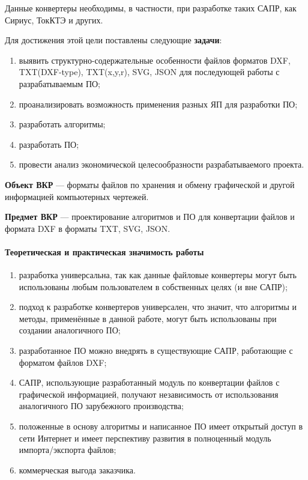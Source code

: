 Данные конвертеры необходимы, в частности, при разработке таких САПР, как Сириус, ТокКТЭ и других.

Для достижения этой цели поставлены следующие \textbf{задачи}:

\begin{enumerate}[1)]
	\item выявить структурно-содержательные особенности файлов форматов DXF, TXT(DXF-type), TXT(x,y,r), SVG, JSON для последующей работы с разрабатываемым ПО;
	\item проанализировать возможность применения разных ЯП для разработки ПО;
	\item разработать алгоритмы;
	\item разработать ПО;
	\item провести анализ экономической целесообразности разрабатываемого проекта.
\end{enumerate}

\textbf{Объект ВКР} --- форматы файлов по хранения и обмену графической и другой информацией компьютерных чертежей.

\textbf{Предмет ВКР} --- проектирование алгоритмов и ПО для конвертации файлов и формата DXF в форматы TXT, SVG, JSON.

\paragraph{Теоретическая и практическая значимость работы}

\begin{enumerate}
	\item разработка универсальна, так как данные файловые конвертеры могут быть использованы любым пользователем в собственных целях (и вне САПР);
	\item подход к разработке конвертеров универсален, что значит, что алгоритмы и методы, применённые в данной работе, могут быть использованы при создании аналогичного ПО;
	\item разработанное ПО можно внедрять в существующие САПР, работающие с форматом файлов DXF;
	\item САПР, использующие разработанный модуль по конвертации файлов с графической информацией, получают независимость от использования аналогичного ПО зарубежного производства;
	\item положенные в основу алгоритмы и написанное ПО имеет открытый доступ в сети Интернет и имеет перспективу развития в полноценный модуль импорта/экспорта файлов;
	\item коммерческая выгода заказчика.
\end{enumerate}